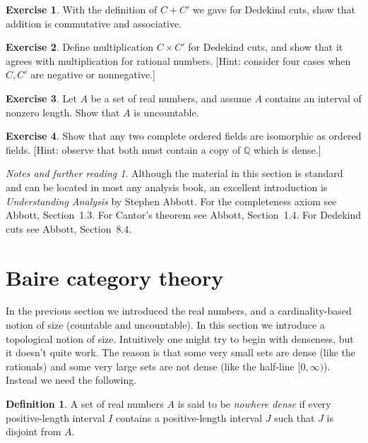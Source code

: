 \documentclass[11pt,oneside]{amsbook}
\newcommand{\Q}{\mathbb Q}
\theoremstyle{definition}
\newtheorem{exercise}{Exercise}[section]
\theoremstyle{plain}
\theoremstyle{definition}
\newtheorem{definition}[theorem]{Definition}
\theoremstyle{remark}
\newtheorem*{notes}{Notes and further reading}
\numberwithin{equation}{section}
\numberwithin{figure}{section}
\begin{document}
\begin{exercise}
  With the definition of $C+C'$ we gave for Dedekind cuts, show that addition is commutative and associative.
\end{exercise}

\begin{exercise}
  Define multiplication $C\times C'$ for Dedekind cuts, and show that it agrees with multiplication for rational numbers. [Hint: consider four cases when $C,C'$ are negative or nonnegative.]
\end{exercise}

\begin{exercise}
  Let $A$ be a set of real numbers, and assume $A$ contains an interval of nonzero length. Show that $A$ is uncountable.
\end{exercise}

\begin{exercise}
  Show that any two complete ordered fields are isomorphic as ordered fields. [Hint: observe that both must contain a copy of $\Q$ which is dense.]
\end{exercise}

\begin{notes}
  Although the material in this section is standard and can be located in most any analysis book, an excellent introduction is \emph{Understanding Analysis} by Stephen Abbott. For the completeness axiom see Abbott, Section~1.3. For Cantor's theorem see Abbott, Section~1.4. For Dedekind cuts see Abbott, Section~8.4.
\end{notes}

\newpage
\section{Baire category theory}

In the previous section we introduced the real numbers, and a cardinality-based notion of size (countable and uncountable). In this section we introduce a topological notion of size. Intuitively one might try to begin with denseness, but it doesn't quite work. The reason is that some very small sets are dense (like the rationals) and some very large sets are not dense (like the half-line $[0,\infty)$). Instead we need the following.

\begin{definition}
  A set of real numbers $A$ is said to be \emph{nowhere dense} if every positive-length interval $I$ contains a positive-length interval $J$ such that $J$ is disjoint from $A$.
\end{definition}
\end{document}
